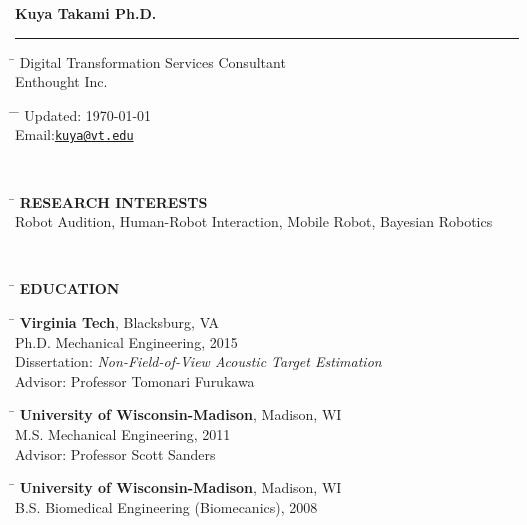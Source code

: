\documentclass[11pt,letter]{article}
\begin{document}
{\bf \huge \noindent Kuya Takami Ph.D.}\vspace{-2mm}\\
\rule{\textwidth}{1.7pt}

\parbox{0.4\textwidth}{ %
\begin{tabbing} %
		\hspace{0.5cm} \= \kill %
		\> Digital Transformation Services Consultant\\
		\> Enthought Inc.
\end{tabbing}}
\hfill %
\parbox{0.4\textwidth}{ %
	\begin{tabbing} %
		\hspace{1cm} \= \hspace{4cm} \= \kill %
		\> Updated: \today \\ %
		\> Email:\href{mailto:kuya@vt.edu}{\tt kuya@vt.edu}  \\ %
	\end{tabbing}
}\\
\parbox{0.7\textwidth}{
\begin{tabbing}
	\hspace{1cm} \= \kill
	\>	{\bf \MakeUppercase{Research Interests}}\\
	\>	Robot Audition, Human-Robot Interaction, Mobile Robot, Bayesian Robotics
\end{tabbing}
}
\\
\vspace{-2mm}
\begin{tabbing}
	\hspace{1cm}\=\kill
	\>  {\bf \Large EDUCATION}
\end{tabbing} \vspace{-7mm}
\begin{tabbing}
	\hspace{3cm} \= \kill
	{\footnotesize } \> {\bf Virginia Tech}, Blacksburg, VA\\
	\> \quad  Ph.D.  Mechanical Engineering, 2015 \\
	\> \quad Dissertation: {\it Non-Field-of-View Acoustic Target Estimation}\\
	\> \quad Advisor: Professor Tomonari Furukawa
\end{tabbing}
\begin{tabbing}
	\hspace{3cm} \= \kill
	{\footnotesize } \> {\bf University of Wisconsin-Madison}, Madison, WI\\
	\> \quad M.S.  Mechanical Engineering, 2011 \\
	\> \quad Advisor: Professor Scott Sanders
\end{tabbing}
\begin{tabbing}
	\hspace{3cm} \= \kill
	{\footnotesize } \> {\bf University of Wisconsin-Madison}, Madison, WI\\
	\> \quad B.S.  Biomedical Engineering (Biomecanics), 2008\\
\end{tabbing}
\end{document}
